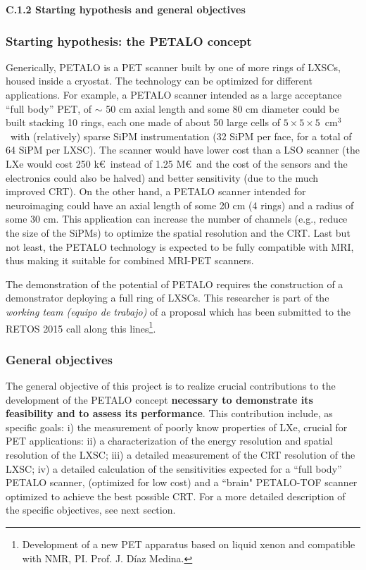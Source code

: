 \noindent\textbf{C.1.2 Starting hypothesis and general objectives}


\subsubsection*{Starting hypothesis: the PETALO concept}

Generically, PETALO is a PET scanner built by one of more rings of LXSCs, housed inside a cryostat. The technology can be optimized for different applications. For example, a PETALO scanner intended as a large acceptance ``full body'' PET, of $\sim$ 50 cm axial length and some 80 cm diameter could be built stacking 10 rings, each one made of about 50 large cells of $5 \times 5 \times 5$~cm$^3$~with (relatively) sparse SiPM instrumentation (32 SiPM per face, for a total of 64 SiPM per LXSC). The scanner would have lower cost than a LSO scanner (the LXe would cost 250 k\euro\ instead of 1.25 M\euro\, and the cost of the sensors and the electronics could also be halved) and better sensitivity (due to the much improved CRT).  On the other hand, a PETALO scanner intended for neuroimaging could have an axial length of some 20 cm (4 rings) and a radius of some 30 cm. This application can increase the number of channels (e.g., reduce the size of the SiPMs) to optimize the spatial resolution and the CRT.
Last but not least, the PETALO technology is expected to be fully compatible with MRI, thus making it suitable for combined MRI-PET scanners. 

The demonstration of the potential of PETALO requires the construction of a demonstrator deploying a full ring of LXSCs. This researcher is part of the {\em working team (equipo de trabajo)} of a proposal which has been submitted to the RETOS 2015 call along this lines\footnote{Development of a new PET apparatus based on liquid
xenon and compatible with NMR, PI. Prof. J. D\'iaz Medina.}. 

\subsubsection*{General objectives}

The general objective of this project is to realize crucial contributions to the development of the PETALO concept  {\bf necessary to demonstrate its feasibility and to assess its performance}. This contribution include, as specific goals: i) the measurement of poorly know properties of LXe, crucial  for PET applications: ii) 
a characterization of the energy resolution and spatial resolution of the LXSC; iii) a detailed measurement of the CRT resolution of the LXSC; iv) a  detailed calculation of the sensitivities expected for a ``full body'' PETALO scanner, (optimized for low cost) and a ``brain" PETALO-TOF scanner optimized to achieve the best possible CRT. For a more detailed description of the specific objectives, see next section.

